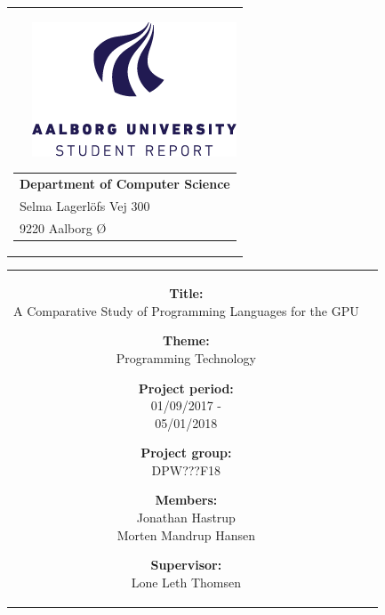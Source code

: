 \thispagestyle{empty}

{\samepage 
\begin{tabular}{r}
	\parbox{\textwidth}{ {\includegraphics[scale=0.5]{misc/aauLogoEn.png}}
	\hfill \parbox{7cm}{\begin{tabular}{l} %
		{\small \textbf{Department of Computer Science}}\\
		{\small Selma Lagerlöfs Vej 300} \\
		{\small 9220 Aalborg Ø}
	\end{tabular}}
	}
\end{tabular}

\begin{tabular}{cc}
	\parbox{7cm}{
	\begin{description}
		\item { \textbf{Title:}}\\ 
			A Comparative Study of Programming Languages for the GPU
    		\item { \textbf{Theme:}}\\ 
			Programming Technology\\
	\end{description}
	
	\parbox{7cm}{
	\begin{description}
		\item { \textbf{Project period:}}\\
			01/09/2017 -\\
			05/01/2018\\
 		\hspace{4cm}
		\item { \textbf{Project group:}}\\
  			DPW???F18\\
 		\hspace{4cm}
		\item {\textbf{Members:}}\\
            Jonathan Hastrup\\
            Morten Mandrup Hansen\\
		\hspace{2cm}
		\item { \textbf{Supervisor:}}\\
 			Lone Leth Thomsen\\
  	\end{description}
	}

}
\end{tabular}}
